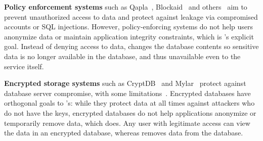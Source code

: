 \textbf{Policy enforcement systems} such as Qapla~\cite{qapla},
Blockaid~\cite{blockaid} and others~\cite{static, jeeves, jif, hails, ifdb,
oracle, multiverse, sieve} aim to prevent unauthorized access to data and
protect against leakage via compromised accounts or SQL injections. 
%
However, policy-enforcing systems do not help users anonymize data or maintain
application integrity constraints, which is \sys's explicit
goal.
%
Instead of denying access to data, \sys changes the database contents so sensitive
data is no longer available in the database, and thus unavailable even to the
service itself.
%

\textbf{Encrypted storage systems} such as CryptDB~\cite{cryptdb} and
Mylar~\cite{mylar} protect against database server compromise, with some
limitations~\cite{grubbs}.
%
%
%
Encrypted databases have orthogonal goals to \sys's: while they protect data at all times
against attackers who do not have the keys, encrypted databases do not help applications
anonymize or temporarily remove data, which \sys does.
%
Any user with legitimate access can view the data in an encrypted database,
whereas \sys removes \xxed data from the database.


